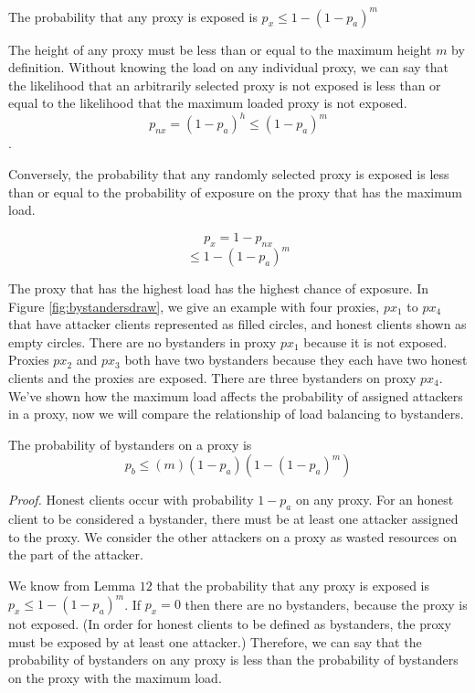 \begin{lemma}{The probability that any proxy is exposed is $p_x \leq 1 - (1-p_a)^{m}$}

The height of any proxy must be less than or equal to the maximum height $m$ by definition. Without knowing the load on any individual proxy, we can say that the likelihood that an arbitrarily selected proxy is not exposed is less than or equal to the likelihood that the maximum loaded proxy is not exposed.
$$p_{nx} = (1-p_a)^{h} \leq (1-p_a)^{m}$$.

Conversely, the probability that any randomly selected proxy is exposed is less than or equal to the probability of exposure on the proxy that has the maximum load.

$$p_x = 1 - p_{nx}$$
$$ \leq 1 - (1-p_a)^{m}$$

\end{lemma}

The proxy that has the highest load has the highest chance of exposure. In Figure \ref{fig:bystandersdraw}, we give an example with four proxies, $px_1$ to $px_4$ that have attacker clients represented as filled circles, and honest clients shown as empty circles. There are no bystanders in proxy $px_1$ because it is not exposed. Proxies $px_2$ and $px_3$ both have two bystanders because they each have two honest clients and the proxies are exposed. There are three bystanders on proxy $px_4$. We've shown how the maximum load affects the probability of assigned attackers in a proxy, now we will compare the relationship of load balancing to bystanders. 
 


\begin{theorem}{The probability of bystanders on a proxy is $$p_b \leq (m)(1-p_a)(1-(1-p_a)^{m})$$}
\end{theorem}

\textit{Proof.} Honest clients occur with probability $1-p_a$ on any proxy. For an honest client to be considered a bystander, there must be at least one attacker assigned to the proxy. We consider the other attackers on a proxy as wasted resources on the part of the attacker.

We know from Lemma $12$ that the probability that any proxy is exposed is $p_x \leq 1 - (1-p_a)^{m}$. If $p_x = 0$ then there are no bystanders, because the proxy is not exposed. (In order for honest clients to be defined as bystanders, the proxy must be exposed by at least one attacker.) Therefore, we can say that the probability of bystanders on any proxy is less than the probability of bystanders on the proxy with the maximum load.

